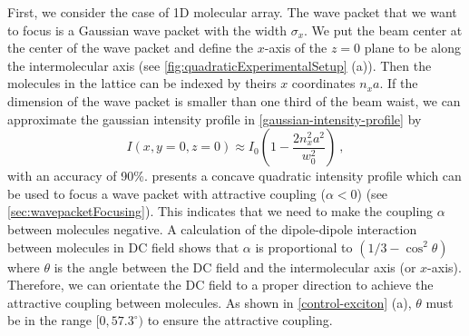 First, we consider the case of 1D molecular array. The wave packet that we want to focus is a Gaussian wave packet
with the width $\sigma_x$. 
We put  the beam center at the center of the wave packet and define the $x$-axis of the $z=0$ plane to be along the intermolecular 
axis (see \autoref{fig:quadraticExperimentalSetup} (a)). Then the molecules in the lattice
can be indexed by theirs $x$ coordinates $n_x a$. 
If the dimension of the wave packet is smaller than one third of the
beam waist, we can approximate the gaussian intensity profile in
\autoref{gaussian-intensity-profile} by
\begin{equation}
I(x, y=0, z=0) \approx I_{0}\left(1- \frac{2 n_x^2 a^2}{w_0^2}\right) \ ,  \label{quadratic-profile-1D}
\end{equation}
with an accuracy of 90\%.  presents a concave quadratic intensity
profile which can be used to focus a wave packet with attractive
coupling ($\alpha < 0$) (see \autoref{sec:wavepacketFocusing}). This indicates that we need to make the coupling 
$\alpha$ between molecules negative. 
A calculation of the dipole-dipole interaction between molecules in DC field shows that $\alpha$ is proportional
to $(1/3 - \cos^2\theta)$ where $\theta$ is the angle between the DC field and the intermolecular axis 
(or $x$-axis). Therefore, we can orientate the DC field to a proper direction to achieve the attractive coupling 
between molecules. As shown in \autoref{control-exciton} (a), $\theta$ must be in the range  $[0, 57.3^{\circ})$
to ensure the attractive coupling. 

